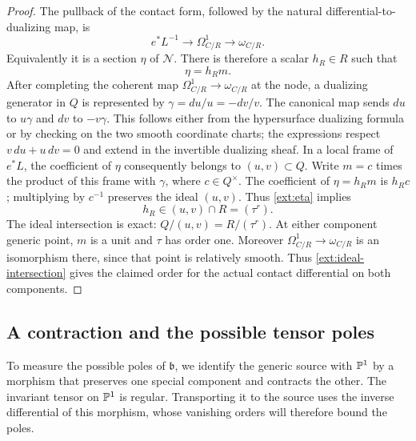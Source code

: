 \begin{proof}
The pullback of the contact form, followed by the natural
differential-to-dualizing map, is
\[
e^*L^{-1}\longrightarrow\Omega^1_{C/R}
\longrightarrow\omega_{C/R}.
\]
Equivalently it is a section $\eta$ of $\mathcal N$. There is
therefore a scalar $h_R\in R$ such that
\begin{equation}\label{ext:eta}
\eta=h_Rm.
\end{equation}
After completing the coherent map $\Omega^1_{C/R}\to\omega_{C/R}$ at
the node, a dualizing generator in $Q$ is represented by
$\gamma=du/u=-dv/v$. The canonical map sends
$du$ to $u\gamma$ and $dv$ to $-v\gamma$. This follows either
from the hypersurface dualizing formula or by checking on the two
smooth coordinate charts; the expressions respect
$v\,du+u\,dv=0$ and extend in the invertible dualizing sheaf.
In a local frame of $e^*L$, the coefficient of $\eta$ consequently
belongs to $(u,v)\subset Q$. Write $m=c$ times the product of this
frame with $\gamma$, where $c\in Q^\times$. The coefficient of
$\eta=h_Rm$ is $h_Rc$; multiplying by $c^{-1}$ preserves the ideal
$(u,v)$. Thus \eqref{ext:eta} implies
\begin{equation}\label{ext:ideal-intersection}
h_R\in (u,v)\cap R=(\tau^r).
\end{equation}
The ideal intersection is exact: $Q/(u,v)=R/(\tau^r)$.
At either component generic point, $m$ is a unit and $\tau$ has
order one. Moreover $\Omega^1_{C/R}\to\omega_{C/R}$ is an
isomorphism there, since that point is relatively smooth. Thus
\eqref{ext:ideal-intersection} gives the claimed order for the actual
contact differential on both components.
\end{proof}

\subsection{A contraction and the possible tensor poles}

To measure the possible poles of $\mathfrak b$, we identify the generic
source with $\mathbb P^1$ by a morphism that preserves one special component
and contracts the other. The invariant tensor on $\mathbb P^1$ is regular.
Transporting it to the source uses the inverse differential of this
morphism, whose vanishing orders will therefore bound the poles.

